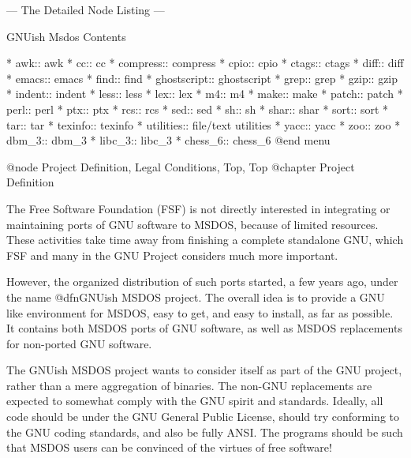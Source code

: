  --- The Detailed Node Listing ---

GNUish Msdos Contents

* awk::                         awk
* cc::                          cc
* compress::                    compress
* cpio::                        cpio
* ctags::                       ctags
* diff::                        diff
* emacs::                       emacs
* find::                        find
* ghostscript::                 ghostscript
* grep::                        grep
* gzip::                        gzip
* indent::                      indent
* less::                        less
* lex::                         lex
* m4::                          m4
* make::                        make
* patch::                       patch
* perl::                        perl
* ptx::                         ptx
* rcs::                         rcs
* sed::                         sed
* sh::                          sh
* shar::                        shar
* sort::                        sort
* tar::                         tar
* texinfo::                     texinfo
* utilities::                   file/text utilities
* yacc::                        yacc
* zoo::                         zoo
* dbm_3::                       dbm_3
* libc_3::                      libc_3
* chess_6::                     chess_6
@end menu

@node Project Definition, Legal Conditions, Top, Top
@chapter Project Definition

The Free Software Foundation (FSF) is not directly interested in
integrating or maintaining ports of GNU software to MSDOS, because of
limited resources.  These activities take time away from finishing a
complete standalone GNU, which FSF and many in the GNU Project considers
much more important.

However, the organized distribution of such ports started, a few years
ago, under the name @dfn{GNUish MSDOS project}.  The overall idea is to
provide a GNU like environment for MSDOS, easy to get, and easy to
install, as far as possible.  It contains both MSDOS ports of GNU
software, as well as MSDOS replacements for non-ported GNU software.

The GNUish MSDOS project wants to consider itself as part of the GNU
project, rather than a mere aggregation of binaries.  The non-GNU
replacements are expected to somewhat comply with the GNU spirit and
standards.  Ideally, all code should be under the GNU General Public
License, should try conforming to the GNU coding standards, and also be
fully ANSI.  The programs should be such that MSDOS users can be
convinced of the virtues of free software!

